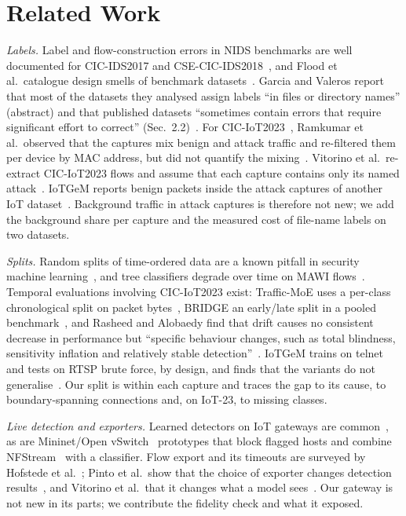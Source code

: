 \section{Related Work}\label{sec:related}

\emph{Labels.} Label and flow-construction errors in NIDS benchmarks are well documented for CIC-IDS2017 and CSE-CIC-IDS2018~\cite{engelen2021troubleshooting,liu2022error}, and Flood et al.\ catalogue design smells of benchmark datasets~\cite{flood2024smells}. Garcia and Valeros report that most of the datasets they analysed assign labels ``in files or directory names'' (abstract) and that published datasets ``sometimes contain errors that require significant effort to correct'' (Sec.~2.2)~\cite{garcia2023labeling}. For CIC-IoT2023~\cite{neto2023ciciot2023}, Ramkumar et al.\ observed that the captures mix benign and attack traffic and re-filtered them per device by MAC address, but did not quantify the mixing~\cite{ramkumar2024diagnosing}. Vitorino et al.\ re-extract CIC-IoT2023 flows and assume that each capture contains only its named attack~\cite{vitorino2025revisiting}. IoTGeM reports benign packets inside the attack captures of another IoT dataset~\cite{kostas2024iotgem}. Background traffic in attack captures is therefore not new; we add the background share per capture and the measured cost of file-name labels on two datasets.

\emph{Splits.} Random splits of time-ordered data are a known pitfall in security machine learning~\cite{arp2022dos,pendlebury2019tesseract,apruzzese2023sok}, and tree classifiers degrade over time on MAWI flows~\cite{schraven2026mawiflow}. Temporal evaluations involving CIC-IoT2023 exist: Traffic-MoE uses a per-class chronological split on packet bytes~\cite{zhou2026trafficmoe}, BRIDGE an early/late split in a pooled benchmark~\cite{bridge2026tchnet}, and Rasheed and Alobaedy find that drift causes no consistent decrease in performance but ``specific behaviour changes, such as total blindness, sensitivity inflation and relatively stable detection''~\cite{rasheed2026drift}. IoTGeM trains on telnet and tests on RTSP brute force, by design, and finds that the variants do not generalise~\cite{kostas2024iotgem}. Our split is within each capture and traces the gap to its cause, to boundary-spanning connections and, on IoT-23, to missing classes.

\emph{Live detection and exporters.} Learned detectors on IoT gateways are common~\cite{realguard2022}, as are Mininet/Open vSwitch~\cite{lantz2010mininet,pfaff2015ovs} prototypes that block flagged hosts and combine NFStream~\cite{aouini2022nfstream} with a classifier. Flow export and its timeouts are surveyed by Hofstede et al.~\cite{hofstede2014flow}; Pinto et al.\ show that the choice of exporter changes detection results~\cite{pinto2025flowexporter,pinto2025hera}, and Vitorino et al.\ that it changes what a model sees~\cite{vitorino2025revisiting}. Our gateway is not new in its parts; we contribute the fidelity check and what it exposed.

